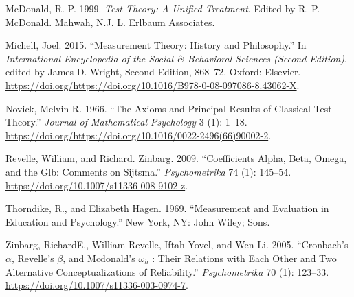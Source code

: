 \documentclass[11pt,]{article}
\begin{document}
\leavevmode\hypertarget{ref-McDonald1999}{}%
McDonald, R. P. 1999. \emph{Test Theory: A Unified Treatment}. Edited by
R. P. McDonald. Mahwah, N.J. L. Erlbaum Associates.

\leavevmode\hypertarget{ref-Michell2015}{}%
Michell, Joel. 2015. ``Measurement Theory: History and Philosophy.'' In
\emph{International Encyclopedia of the Social \& Behavioral Sciences
(Second Edition)}, edited by James D. Wright, Second Edition, 868--72.
Oxford: Elsevier.
\url{https://doi.org/https://doi.org/10.1016/B978-0-08-097086-8.43062-X}.

\leavevmode\hypertarget{ref-Novick1966}{}%
Novick, Melvin R. 1966. ``The Axioms and Principal Results of Classical
Test Theory.'' \emph{Journal of Mathematical Psychology} 3 (1): 1--18.
\url{https://doi.org/https://doi.org/10.1016/0022-2496(66)90002-2}.

\leavevmode\hypertarget{ref-Revelle2009}{}%
Revelle, William, and Richard. Zinbarg. 2009. ``Coefficients Alpha,
Beta, Omega, and the Glb: Comments on Sijtsma.'' \emph{Psychometrika} 74
(1): 145--54. \url{https://doi.org/10.1007/s11336-008-9102-z}.

\leavevmode\hypertarget{ref-Thorndike1969}{}%
Thorndike, R., and Elizabeth Hagen. 1969. ``Measurement and Evaluation
in Education and Psychology.'' New York, NY: John Wiley; Sons.

\leavevmode\hypertarget{ref-Zinbarg2005}{}%
Zinbarg, RichardE., William Revelle, Iftah Yovel, and Wen Li. 2005.
``Cronbach's \(\alpha\), Revelle's \(\beta\), and Mcdonald's
\(\omega_h\) : Their Relations with Each Other and Two Alternative
Conceptualizations of Reliability.'' \emph{Psychometrika} 70 (1):
123--33. \url{https://doi.org/10.1007/s11336-003-0974-7}.
\end{document}
